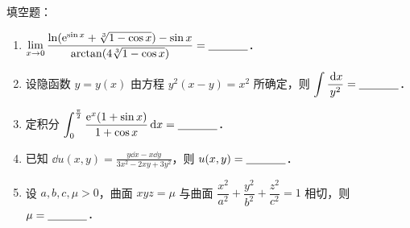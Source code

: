 
填空题：
\begin{enumerate}[label=(\arabic*)]
  \item $\displaystyle \lim_{x\to 0}\frac{\ln(\mathrm{e}^{\sin x}+\sqrt[3]{1-\cos x})-\sin x}{\arctan(4\sqrt[3]{1-\cos x})}=\underline{\hspace{3.5em}}$．
  \item 设隐函数 $y=y(x)$ 由方程 $y^2(x-y)=x^2$ 所确定，则 $\displaystyle \int\frac{\,\mathrm{d} x}{y^2}=\underline{\hspace{3.5em}}$．
  \item 定积分 $\displaystyle \int_0^{\frac{\pi}{2}}\frac{\mathrm{e}^x(1+\sin x)}{1+\cos x}\,\mathrm{d} x=\underline{\hspace{3.5em}}$．
  \item 已知 $\dd u(x,y)=\frac{y\dd x-x\dd y}{3x^2-2xy+3y^2}$，则 $u(x,y)=\underline{\hspace{3.5em}}$．
  \item 设 $a,b,c,\mu>0$，曲面 $xyz=\mu$ 与曲面 $\dfrac{x^2}{a^2}+\dfrac{y^2}{b^2}+\dfrac{z^2}{c^2}=1$ 相切，则 $\mu=\underline{\hspace{3.5em}}$．
\end{enumerate}
